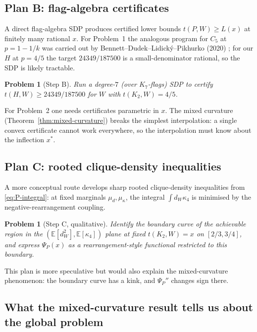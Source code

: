 \documentclass[11pt]{amsart}
\newtheorem{problem}[theorem]{Problem}
\theoremstyle{definition}
\newcommand{\E}{\mathbb E}
\newcommand{\1}{\mathbf 1}
\begin{document}
\subsection{Plan B: flag-algebra certificates}

A direct flag-algebra SDP produces certified lower bounds $t(P,W)\ge L(x)$ at
finitely many rational $x$.  For Problem~1 the analogous program for $C_5$ at
$p=1-1/k$ was carried out by Bennett--Dudek--Lidick\'y--Pikhurko (2020)
\cite{BennettDudekLidickyPikhurkoC5}; for our $H$ at $p=4/5$ the target
$24349/187500$ is a small-denominator rational, so the SDP is likely tractable.

\begin{problem}[Step B]
\label{prob:B}
Run a degree-$7$ (over $K_7$-flags) SDP to certify $t(H,W)\ge 24349/187500$ for
$W$ with $t(K_2,W)=4/5$.
\end{problem}

For Problem~2 one needs certificates parametric in $x$.  The mixed curvature
(Theorem~\ref{thm:mixed-curvature}) breaks the simplest interpolation: a single
convex certificate cannot work everywhere, so the interpolation must know about
the inflection $x^*$.

\subsection{Plan C: rooted clique-density inequalities}

A more conceptual route develops sharp rooted clique-density inequalities from
\eqref{eq:P-integral}: at fixed marginals $\mu_d,\mu_\kappa$, the integral
$\int d_W\kappa_4$ is minimised by the negative-rearrangement coupling.

\begin{problem}[Step C, qualitative]
\label{prob:C}
Identify the boundary curve of the achievable region in the
$(\E[d_W^2],\E[\kappa_4])$ plane at fixed $t(K_2,W)=x$ on $[2/3,3/4]$, and express
$\Psi_P(x)$ as a rearrangement-style functional restricted to this boundary.
\end{problem}

This plan is more speculative but would also explain the mixed-curvature
phenomenon: the boundary curve has a kink, and $\Psi_P''$ changes sign there.

\subsection{What the mixed-curvature result tells us about the global problem}
\end{document}
